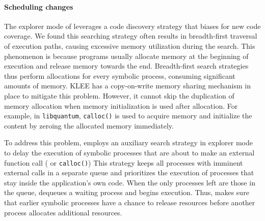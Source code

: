 \paragraph{Scheduling changes}

The explorer mode of \lancet leverages a code discovery strategy that biases for new code coverage. We found this searching strategy often results in breadth-first traversal of execution paths, causing excessive memory utilization during the search. This phenomenon is because programs usually allocate memory at the beginning of execution and release memory towards the end. 
Breadth-first search strategies thus perform allocations for every symbolic process, consuming significant amounts of memory. KLEE has a copy-on-write memory sharing mechanism in place to mitigate this problem. However, it cannot skip the duplication of memory allocation when memory initialization is used after allocation. For example, in {\tt libquantum}, {\tt calloc()} is used to acquire memory and initialize the content by zeroing the allocated memory immediately.

To address this problem, \lancet employs an auxiliary search strategy in explorer mode to delay the execution of symbolic processes that are about to make an external function call ( or {\tt calloc()})
This strategy keeps all processes with imminent external calls in a separate queue and prioritizes the execution of processes that stay inside the application's own code. When the only processes left are those in the queue, \lancet dequeues a waiting process and begins execution. Thus, \lancet makes sure that earlier symbolic processes have a chance to release resources before another process allocates additional resources.



